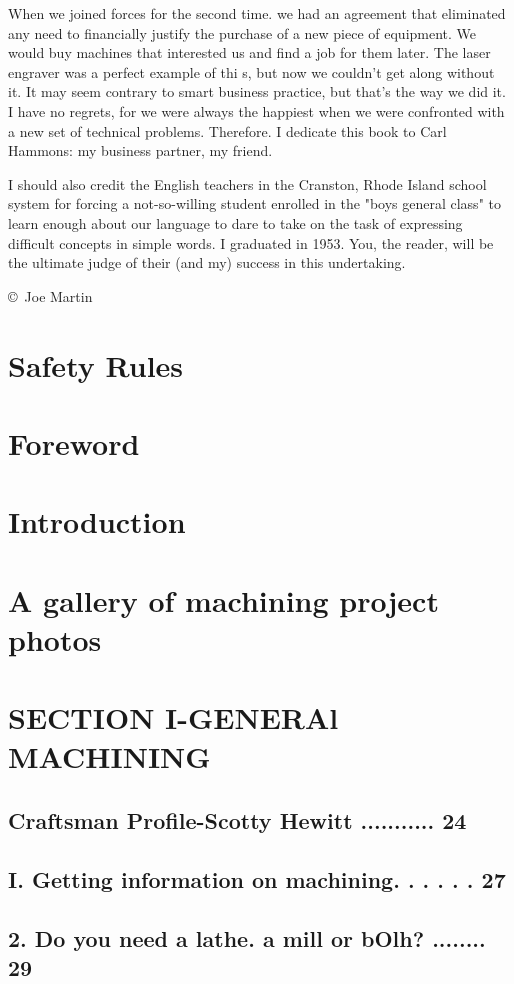 When we joined forces for the second time. we had
an agreement that eliminated any need to financially
justify the purchase of a new piece of equipment.
We would buy machines that interested us and find
a job for them later. The laser engraver was a
perfect example of thi s, but now we couldn't get
along without it. It may seem contrary to smart
business practice, but that's the way we did it. I have
no regrets, for we were always the happiest when
we were confronted with a new set of technical
problems. Therefore. I dedicate this book to Carl
Hammons: my business partner, my friend.

\bigskip
I should also credit the English teachers in the
Cranston, Rhode Island school system for forcing a
not-so-willing student enrolled in the "boys general
class" to learn enough about our language to dare to
take on the task of expressing difficult concepts in
simple words. I graduated in 1953. You, the reader,
will be the ultimate judge of their (and my) success
in this undertaking.

\bigskip\copyright\ Joe Martin

\chapter{Safety Rules}
\chapter{Foreword}
\chapter{Introduction}
\chapter{A gallery of machining project photos}

\chapter{SECTION I-GENERAl MACHINING}
\section{Craftsman Profile-Scotty Hewitt ........... 24}
\section{I. Getting information on machining. . . . . . 27}
\section{2. Do you need a lathe. a mill or bOlh? ........ 29}
